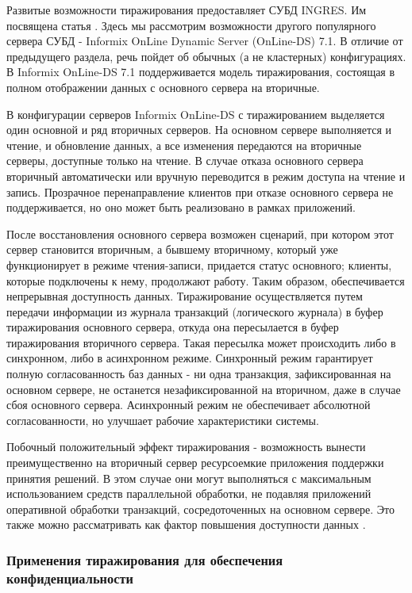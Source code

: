 Развитые возможности тиражирования предоставляет СУБД INGRES.
Им посвящена статья \cite{BeynonDavies}. Здесь мы рассмотрим возможности другого популярного сервера
СУБД - Informix OnLine Dynamic Server (OnLine-DS) 7.1. В отличие от предыдущего раздела, речь
пойдет об обычных (а не кластерных) конфигурациях.
В Informix OnLine-DS 7.1 поддерживается модель тиражирования, состоящая в полном отображении данных
с основного сервера на вторичные.

В конфигурации серверов Informix OnLine-DS с тиражированием выделяется один основной и ряд
вторичных серверов. На основном сервере выполняется и чтение, и обновление данных, а все изменения
передаются на вторичные серверы, доступные только на чтение. В случае отказа основного сервера
вторичный автоматически или вручную переводится в режим доступа на чтение и запись. Прозрачное
перенаправление клиентов при отказе основного сервера не поддерживается, но оно может быть
реализовано в рамках приложений.

После восстановления основного сервера возможен сценарий, при котором этот сервер становится
вторичным, а бывшему вторичному, который уже функционирует в режиме чтения-записи, придается
статус основного; клиенты, которые подключены к нему, продолжают работу. Таким образом,
обеспечивается непрерывная доступность данных.
Тиражирование осуществляется путем передачи информации из журнала транзакций (логического журнала)
в буфер тиражирования основного сервера, откуда она пересылается в буфер тиражирования вторичного
сервера. Такая пересылка может происходить либо в синхронном, либо в асинхронном режиме. Синхронный
режим гарантирует полную согласованность баз данных - ни одна транзакция, зафиксированная на
основном сервере, не останется незафиксированной на вторичном, даже в случае сбоя основного
сервера. Асинхронный режим не обеспечивает абсолютной согласованности, но улучшает рабочие
характеристики системы.

Побочный положительный эффект тиражирования - возможность вынести преимущественно на вторичный
сервер ресурсоемкие приложения поддержки принятия решений. В этом случае они могут выполняться с
максимальным использованием средств параллельной обработки, не подавляя приложений оперативной
обработки транзакций, сосредоточенных на основном сервере. Это также можно рассматривать как фактор
повышения доступности данных \cite{data-replication}.

\subsubsection{Применения тиражирования для обеспечения конфиденциальности}

